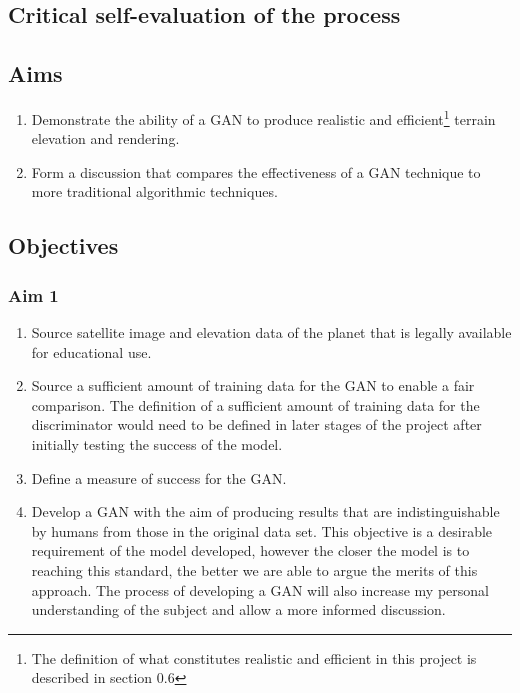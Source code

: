 \documentclass[a4paper]{report}
\begin{document}
\subsection{Critical self-evaluation of the process}
\renewcommand\bibname{References}


\begin{appendices}
\subsection{Aims}
\begin{enumerate}
    \item Demonstrate the ability of a GAN to produce realistic and efficient\footnote{The definition of what constitutes realistic and efficient in this project is described in section 0.6} terrain elevation and rendering.
    \item Form a discussion that compares the effectiveness of a GAN technique to more traditional algorithmic techniques.
\end{enumerate}
\subsection{Objectives}
\subsubsection{Aim 1}
\begin{enumerate}
\renewcommand{\theenumi}{\alph{enumi}}
    \item Source satellite image and elevation data of the planet that is legally available for educational use.
    \item Source a sufficient amount of training data for the GAN to enable a fair comparison. The definition of a sufficient amount of training data for the discriminator would need to be defined in later stages of the project after initially testing the success of the model.
    \item Define a measure of success for the GAN.
    \item Develop a GAN with the aim of producing results that are indistinguishable by humans from those in the original data set. This objective is a desirable requirement of the model developed, however the closer the model is to reaching this standard, the better we are able to argue the merits of this approach. The process of developing a GAN will also increase my personal understanding of the subject and allow a more informed discussion.
\end{enumerate}

\end{appendices}
\end{document}
